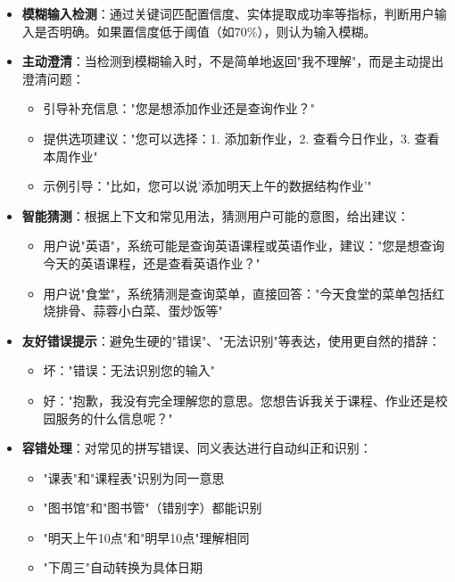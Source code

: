 \documentclass[12pt,a4paper]{article}
\begin{document}
\begin{itemize}
    \item \textbf{模糊输入检测}：通过关键词匹配置信度、实体提取成功率等指标，判断用户输入是否明确。如果置信度低于阈值（如70\%），则认为输入模糊。
    
    \item \textbf{主动澄清}：当检测到模糊输入时，不是简单地返回"我不理解"，而是主动提出澄清问题：
        \begin{itemize}
            \item 引导补充信息："您是想添加作业还是查询作业？"
            \item 提供选项建议："您可以选择：1. 添加新作业，2. 查看今日作业，3. 查看本周作业"
            \item 示例引导："比如，您可以说'添加明天上午的数据结构作业'"
        \end{itemize}
    
    \item \textbf{智能猜测}：根据上下文和常见用法，猜测用户可能的意图，给出建议：
        \begin{itemize}
            \item 用户说"英语"，系统可能是查询英语课程或英语作业，建议："您是想查询今天的英语课程，还是查看英语作业？"
            \item 用户说"食堂"，系统猜测是查询菜单，直接回答："今天食堂的菜单包括红烧排骨、蒜蓉小白菜、蛋炒饭等"
        \end{itemize}
    
    \item \textbf{友好错误提示}：避免生硬的"错误"、"无法识别"等表达，使用更自然的措辞：
        \begin{itemize}
            \item 坏："错误：无法识别您的输入"
            \item 好："抱歉，我没有完全理解您的意思。您想告诉我关于课程、作业还是校园服务的什么信息呢？"
        \end{itemize}
    
    \item \textbf{容错处理}：对常见的拼写错误、同义表达进行自动纠正和识别：
        \begin{itemize}
            \item "课表"和"课程表"识别为同一意思
            \item "图书馆"和"图书管"（错别字）都能识别
            \item "明天上午10点"和"明早10点"理解相同
            \item "下周三"自动转换为具体日期
        \end{itemize}
\end{itemize}
\end{document}
